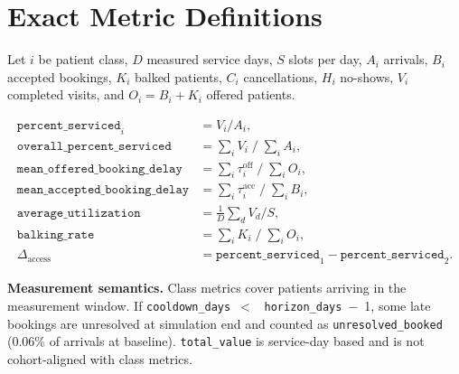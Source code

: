 \documentclass[11pt]{article}
\begin{document}
\section{Exact Metric Definitions}
\label{app:defs}

Let $i$ be patient class, $D$ measured service days, $S$ slots per day,
$A_i$ arrivals, $B_i$ accepted bookings, $K_i$ balked patients, $C_i$
cancellations, $H_i$ no-shows, $V_i$ completed visits, and $O_i = B_i +
K_i$ offered patients.

\begin{align*}
\texttt{percent\_serviced}_i &= V_i / A_i, \\
\texttt{overall\_percent\_serviced} &= \textstyle\sum_i V_i \;/\; \textstyle\sum_i A_i, \\
\texttt{mean\_offered\_booking\_delay} &= \textstyle\sum_i \tau^{\text{off}}_i \;/\; \textstyle\sum_i O_i, \\
\texttt{mean\_accepted\_booking\_delay} &= \textstyle\sum_i \tau^{\text{acc}}_i \;/\; \textstyle\sum_i B_i, \\
\texttt{average\_utilization} &= \tfrac{1}{D}\textstyle\sum_d V_d / S, \\
\texttt{balking\_rate} &= \textstyle\sum_i K_i \;/\; \textstyle\sum_i O_i, \\
\Delta_{\text{access}} &= \texttt{percent\_serviced}_1 - \texttt{percent\_serviced}_2.
\end{align*}

\noindent\textbf{Measurement semantics.} Class metrics cover patients
arriving in the measurement window. If \texttt{cooldown\_days}~$<$~%
\texttt{horizon\_days}~$-$~1, some late bookings are unresolved at
simulation end and counted as \texttt{unresolved\_booked} (0.06\% of
arrivals at baseline). \texttt{total\_value} is service-day based and
is not cohort-aligned with class metrics.
\end{document}
